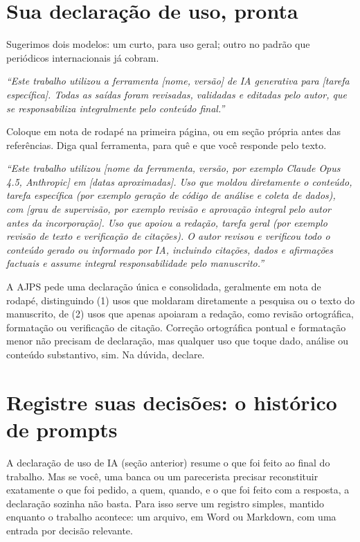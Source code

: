 \documentclass[11pt,a4paper]{article}
\newcommand{\iconBookmark}[1]{%
  \begin{tikzpicture}[baseline=-0.55ex]
    \draw[#1,line width=1pt,line join=round] (-0.11,0.15) -- (0.11,0.15) -- (0.11,-0.15) -- (0,-0.03) -- (-0.11,-0.15) -- cycle;
  \end{tikzpicture}}
\begin{document}
\section{Sua declaração de uso, pronta}
\small
Sugerimos dois modelos: um curto, para uso geral; outro no padrão que periódicos internacionais já cobram.
\begin{leitura}[title={\iconBookmark{white}\ \ Modelo curto, adaptado de Sampaio, Sabbatini e Limongi (2024)}]
\itshape ``Este trabalho utilizou a ferramenta [nome, versão] de IA generativa para [tarefa específica]. Todas as saídas foram revisadas, validadas e editadas pelo autor, que se responsabiliza integralmente pelo conteúdo final.''
\end{leitura}
\begin{dica}
Coloque em nota de rodapé na primeira página, ou em seção própria antes das referências. Diga qual ferramenta, para quê e que você responde pelo texto.
\end{dica}
\begin{leitura}[title={\iconBookmark{white}\ \ Modelo detalhado, segundo a AJPS AI Policy (2026)}]
\itshape ``Este trabalho utilizou [nome da ferramenta, versão, por exemplo Claude Opus 4.5, Anthropic] em [datas aproximadas]. Uso que moldou diretamente o conteúdo, tarefa específica (por exemplo geração de código de análise e coleta de dados), com [grau de supervisão, por exemplo revisão e aprovação integral pelo autor antes da incorporação]. Uso que apoiou a redação, tarefa geral (por exemplo revisão de texto e verificação de citações). O autor revisou e verificou todo o conteúdo gerado ou informado por IA, incluindo citações, dados e afirmações factuais e assume integral responsabilidade pelo manuscrito.''
\end{leitura}
\begin{dica}
A AJPS pede uma declaração única e consolidada, geralmente em nota de rodapé, distinguindo (1) usos que moldaram diretamente a pesquisa ou o texto do manuscrito, de (2) usos que apenas apoiaram a redação, como revisão ortográfica, formatação ou verificação de citação. Correção ortográfica pontual e formatação menor não precisam de declaração, mas qualquer uso que toque dado, análise ou conteúdo substantivo, sim. Na dúvida, declare.
\end{dica}

\section{Registre suas decisões: o histórico de prompts}
\small
A declaração de uso de IA (seção anterior) resume o que foi feito ao final do trabalho. Mas se você, uma banca ou um parecerista precisar reconstituir exatamente o que foi pedido, a quem, quando, e o que foi feito com a resposta, a declaração sozinha não basta. Para isso serve um registro simples, mantido enquanto o trabalho acontece: um arquivo, em Word ou Markdown, com uma entrada por decisão relevante.
\end{document}
